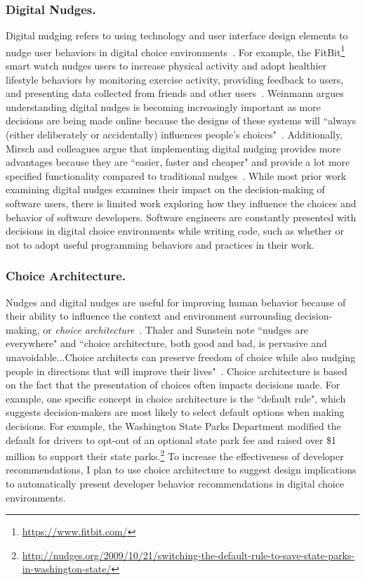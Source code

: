 \vspace{-7pt}

\subsubsection{Digital Nudges.}

Digital nudging refers to using technology and user interface design elements to nudge user behaviors in digital choice environments~\cite{weinmann2016digitalnudging}. For example, the FitBit\footnote{\url{https://www.fitbit.com/}} smart watch nudges users to increase physical activity and adopt healthier lifestyle behaviors by monitoring exercise activity, providing feedback to users, and presenting data collected from friends and other users~\cite{weinmann2016digitalnudging}. Weinmann argues understanding digital nudges is becoming increasingly important as more decisions are being made online because the designs of these systems will ``always (either deliberately or accidentally) influences people's choices"~\cite[p.~433]{weinmann2016digitalnudging}. Additionally, Mirsch and colleagues argue that implementing digital nudging provides more advantages because they are ``easier, faster and cheaper" and provide a lot more specified functionality compared to traditional nudges~\cite[p.~635]{mirsch2017digital}. While most prior work examining digital nudges examines their impact on the decision-making of software users, there is limited work exploring how they influence the choices and behavior of software developers. Software engineers are constantly presented with decisions in digital choice environments while writing code, such as whether or not to adopt useful programming behaviors and practices in their work. 

\subsubsection{Choice Architecture.}

 Nudges and digital nudges are useful for improving human behavior because of their ability to influence the context and environment surrounding decision-making, or \textit{choice architecture}~\cite{thaler2014choice}. Thaler and Sunstein note ``nudges are everywhere" and ``choice architecture, both good and bad, is pervasive and unavoidable...Choice architects can preserve freedom of choice while also nudging people in directions that will improve their lives"~\cite[p.~255]{sunstein2008nudge}. Choice architecture is based on the fact that the presentation of choices often impacts decisions made. For example, one specific concept in choice architecture is the ``default rule", which suggests decision-makers are most likely to select default options when making decisions. For example, the Washington State Parks Department modified the default for drivers to opt-out of an optional state park fee and raised over \$1 million to support their state parks.\footnote{\url{http://nudges.org/2009/10/21/switching-the-default-rule-to-save-state-parks-in-washington-state/}} To increase the effectiveness of developer recommendations, I plan to use choice architecture to suggest design implications to automatically present developer behavior recommendations in digital choice environments.

